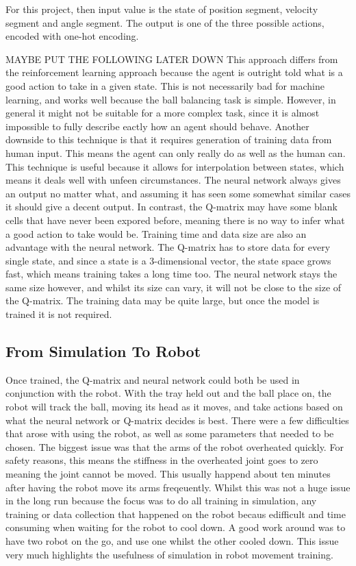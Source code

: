 \documentclass[12pt,a4paper]{article}
\begin{document}
For this project, then input value is the state of position segment, velocity segment and angle segment. The output is one of the three possible actions, encoded with one-hot encoding. 

MAYBE PUT THE FOLLOWING LATER DOWN
This approach differs from the reinforcement learning approach because the agent is outright told what is a good action to take in a given state. This is not necessarily bad for machine learning, and works well because the ball balancing task is simple. However, in general it might not be suitable for a more complex task, since it is almost impossible to fully describe eactly how an agent should behave. Another downside to this technique is that it requires generation of training data from human input. This means the agent can only really do as well as the human can. 
This technique is useful because it allows for interpolation between states, which means it deals well with unfeen circumstances. The neural network always gives an output no matter what, and assuming it has seen some somewhat similar cases it should give a decent output. In contrast, the Q-matrix may have some blank cells that have never been expored before, meaning there is no way to infer what a good action to take would be. Training time and data size are also an advantage with the neural network. The Q-matrix has to store data for every single state, and since a state is a 3-dimensional vector, the state space grows fast, which means training takes a long time too. The neural network stays the same size however, and whilst its size can vary, it will not be close to the size of the Q-matrix. The training data may be quite large, but once the model is trained it is not required. 

\subsection{From Simulation To Robot}
Once trained, the Q-matrix and neural network could both be used in conjunction with the robot. With the tray held out and the ball place on, the robot will track the ball, moving its head as it moves, and take actions based on what the neural network or Q-matrix decides is best. There were a few difficulties that arose with using the robot, as well as some parameters that needed to be chosen. The biggest issue was that the arms of the robot overheated quickly. For safety reasons, this means the stiffness in the overheated joint goes to zero meaning the joint cannot be moved. This usually happend about ten minutes after having the robot move its arms freqeuently. Whilst this was not a huge issue in the long run because the focus was to do all training in simulation, any training or data collection that happened on the robot becaus edifficult and time consuming when waiting for the robot to cool down. A good work around was to have two robot on the go, and use one whilst the other cooled down. This issue very much highlights the usefulness of simulation in robot movement training.
\end{document}
